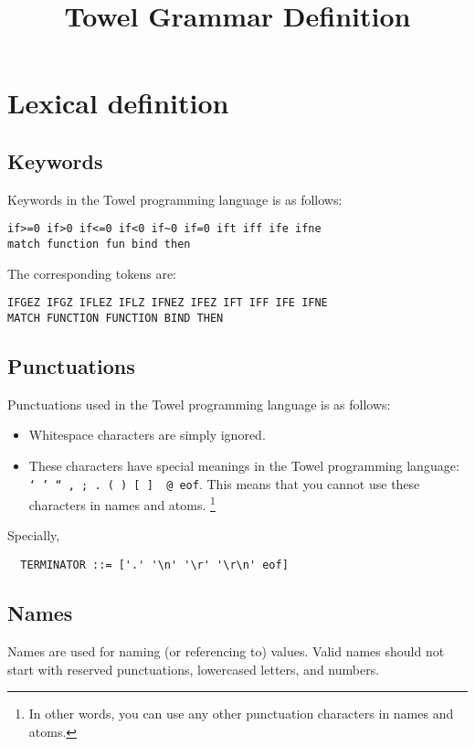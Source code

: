 \documentclass{article}
\title{Towel Grammar Definition}
\begin{document}
\maketitle
\tableofcontents

\section{Lexical definition}

\subsection{Keywords}

Keywords in the Towel programming language is as follows:
\begin{verbatim}
if>=0 if>0 if<=0 if<0 if~0 if=0 ift iff ife ifne
match function fun bind then
\end{verbatim}

The corresponding tokens are:
\begin{verbatim}
IFGEZ IFGZ IFLEZ IFLZ IFNEZ IFEZ IFT IFF IFE IFNE
MATCH FUNCTION FUNCTION BIND THEN
\end{verbatim}

\subsection{Punctuations}

Punctuations used in the Towel programming language is as follows:

\begin{itemize}
\item Whitespace characters are simply ignored.
\item These characters have special meanings in the Towel programming language: \texttt{` ' `` , ; . ( ) [ ] \ @ eof}. This means that you cannot use these characters in names and atoms. \footnote{In other words, you can use any other punctuation characters in names and atoms.}
\end{itemize}

Specially,
\begin{verbatim}
  TERMINATOR ::= ['.' '\n' '\r' '\r\n' eof]
\end{verbatim}

\subsection{Names}

Names are used for naming (or referencing to) values. Valid names should not start with reserved punctuations, lowercased letters, and numbers.
\end{document}

